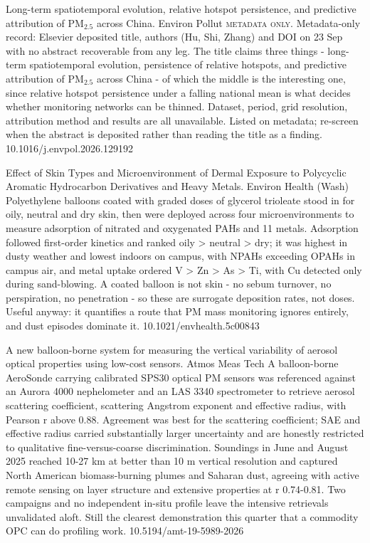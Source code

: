\documentclass[10pt]{article}
\begin{document}
{Long-term spatiotemporal evolution, relative hotspot persistence, and predictive attribution of PM$_{2.5}$ across China.}
{Environ Pollut}
{\textsc{metadata only.} Metadata-only record: Elsevier deposited title, authors (Hu, Shi, Zhang) and DOI on 23 Sep with no abstract recoverable from any leg. The title claims three things - long-term spatiotemporal evolution, persistence of relative hotspots, and predictive attribution of PM$_{2.5}$ across China - of which the middle is the interesting one, since relative hotspot persistence under a falling national mean is what decides whether monitoring networks can be thinned. Dataset, period, grid resolution, attribution method and results are all unavailable. Listed on metadata; re-screen when the abstract is deposited rather than reading the title as a finding.}
{10.1016/j.envpol.2026.129192}

{Effect of Skin Types and Microenvironment of Dermal Exposure to Polycyclic Aromatic Hydrocarbon Derivatives and Heavy Metals.}
{Environ Health (Wash)}
{Polyethylene balloons coated with graded doses of glycerol trioleate stood in for oily, neutral and dry skin, then were deployed across four microenvironments to measure adsorption of nitrated and oxygenated PAHs and 11 metals. Adsorption followed first-order kinetics and ranked oily > neutral > dry; it was highest in dusty weather and lowest indoors on campus, with NPAHs exceeding OPAHs in campus air, and metal uptake ordered V > Zn > As > Ti, with Cu detected only during sand-blowing. A coated balloon is not skin - no sebum turnover, no perspiration, no penetration - so these are surrogate deposition rates, not doses. Useful anyway: it quantifies a route that PM mass monitoring ignores entirely, and dust episodes dominate it.}
{10.1021/envhealth.5c00843}


{A new balloon-borne system for measuring the vertical variability of aerosol optical properties using low-cost sensors.}
{Atmos Meas Tech}
{A balloon-borne AeroSonde carrying calibrated SPS30 optical PM sensors was referenced against an Aurora 4000 nephelometer and an LAS 3340 spectrometer to retrieve aerosol scattering coefficient, scattering Angstrom exponent and effective radius, with Pearson r above 0.88. Agreement was best for the scattering coefficient; SAE and effective radius carried substantially larger uncertainty and are honestly restricted to qualitative fine-versus-coarse discrimination. Soundings in June and August 2025 reached 10-27 km at better than 10 m vertical resolution and captured North American biomass-burning plumes and Saharan dust, agreeing with active remote sensing on layer structure and extensive properties at r 0.74-0.81. Two campaigns and no independent in-situ profile leave the intensive retrievals unvalidated aloft. Still the clearest demonstration this quarter that a commodity OPC can do profiling work.}
{10.5194/amt-19-5989-2026}
\end{document}
